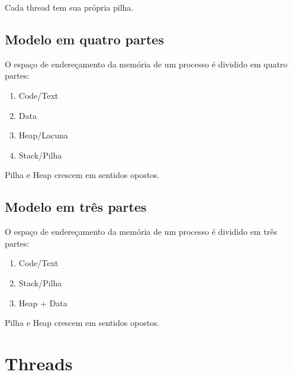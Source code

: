 \documentclass[ ]{article}
\begin{document}
			Cada thread tem  sua própria pilha.
			
		\subsection{Modelo em quatro partes}
		O espaço de endereçamento da memória de um processo é dividido em quatro partes:
			\begin{enumerate}
				\item Code/Text
				\item Data
				\item Heap/Lacuna
				\item Stack/Pilha
			\end{enumerate}
			
		Pilha e Heap crescem em sentidos opostos.
		\subsection{Modelo em três partes}
		O espaço de endereçamento da memória de um processo é dividido em três partes:
			\begin{enumerate}
				\item Code/Text
				\item Stack/Pilha
				\item Heap + Data
			\end{enumerate}
			
		Pilha e Heap crescem em sentidos opostos.
	\section{Threads}
\end{document}
